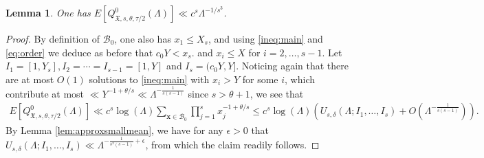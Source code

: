 \documentclass[11pt,reqno]{amsart}
\numberwithin{equation}{section}
\newtheorem{lemma}{Lemma}[section]
\begin{document}
\begin{lemma} \label{lem:smallsolns}
One has $E[Q^0_{\mathfrak{X},s,\theta,\tau/2}(\Lambda)] \ll c^s \Lambda^{-1/s^3}$. 
\end{lemma}

\begin{proof} By definition of $\mathcal{B}_0$, one also has $x_1 \leq X_s$, and using \eqref{ineq:main} and \eqref{eq:order} we deduce as before that $c_0Y < x_s$. and $x_i \leq X$ for $i = 2,\ldots,s-1$. Let $I_1=[1,Y_s], I_2=\cdots=I_{s-1} = [1,Y]$ and $I_s = (c_0Y,Y]$. Noticing again that there are at most $O(1)$ solutions to \eqref{ineq:main} with $x_i > Y$ for some $i$, which contribute at most $\ll Y^{-1+\theta/s} \ll \Lambda^{-\frac{1}{s(s-1)}}$ since $s > \theta+1$, we see that
\begin{align*} E[Q^0_{\mathfrak{X},s,\theta,\tau/2}(\Lambda)] 
\ll c^s \log(\Lambda) \sum_{\mathbf{x} \in \mathcal{B}_0} \prod_{j=1}^s x_j^{-1+\theta/s} \leq c^s \log(\Lambda) (U_{s,\delta}(\Lambda;I_1,\ldots,I_s)+O(\Lambda^{-\frac{1}{s(s-1)}})). 
\end{align*}
By Lemma \ref{lem:approxsmallmean}, we have for any $\epsilon > 0$ that $U_{s,\delta}(\Lambda;I_1,\ldots,I_s) \ll \Lambda^{-\frac{1}{s^2(s-1)}+\epsilon}$,
from which the claim readily follows. 
\end{proof}
\end{document}
